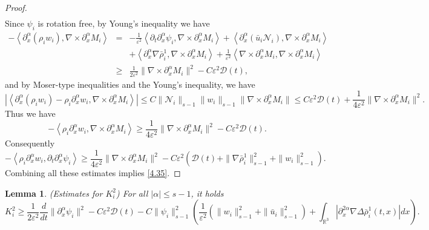 \documentclass[reqno,twoside,12pt,a4paper]{amsart}
\newcommand{\eps}{\mathbb{\varepsilon}}
\newcommand{\al}{\alpha}
\newcommand{\pa}{\partial}
\newcommand{\D}{\nabla}
\newcommand{\Ni}{\mathcal{N}_i}
\newtheorem{lemma}{Lemma}[section]
\numberwithin{equation}{section}
\begin{document}
\begin{proof}
\begin{equation*}
\begin{aligned}
\end{aligned}
\end{equation*}
Since $\psi_i$ is rotation free,  by Young's inequality we have
\begin{eqnarray*}
    - \left\langle \partial^\al_x (\rho_i w_i), \nabla \times \partial^\al_x M_i \right\rangle &= & -\frac{1}{\eps^2} \left\langle \partial_t \partial^\al_x \psi_i, \nabla \times \partial^\al_x M_i \right\rangle + \left\langle \partial^\al_x (\bar{u}_i \Ni), \nabla \times \partial^\al_x M_i \right\rangle\nonumber\\
    && + \left\langle \partial^\al_x \nabla \bar{\rho}_i^1, \nabla \times \partial^\al_x M_i \right\rangle + \frac{1}{\eps^2} \left\langle \nabla \times \partial^\al_x M_i, \nabla \times \partial^\al_x M_i \right\rangle\nonumber\\
    &\geq & \frac{1}{2\eps^2} \|\nabla \times \partial^\al_x M_i\|^2-C\eps^2\mathcal{D}(t),\nonumber
\end{eqnarray*}
and by Moser-type inequalities and the Young's inequality, we have
\begin{equation*}
    \left|\left\langle \partial^\al_x (\rho_i w_i)-\rho_i \partial^\al_x w_i, \nabla \times \partial^\al_x M_i \right\rangle\right| \leq  C \|\Ni\|_{s-1} \|w_i\|_{s-1} \|\nabla \times \partial^\al_x M_i\|  \leq  C\eps^2\mathcal{D}(t)+ \dfrac{1}{4\eps^2}\|\nabla \times \partial^\al_x M_i\|^2.    
\end{equation*}
Thus we have
\begin{equation*}
    -\left\langle \rho_i \partial^\al_x w_i, \nabla \times \partial^\al_x M_i \right\rangle \geq \frac{1}{4\eps^2} \|\nabla \times \partial^\al_x M_i\|^2-C\eps^2\mathcal{D}(t).
\end{equation*}
Consequently
\begin{equation*}
-\left\langle \rho_i \partial^\al_x w_i, \partial_t \partial^\al_x \psi_i \right\rangle \geq \frac{1}{4\eps^2} \|\nabla \times \partial^\al_x M_i\|^2-C\eps^2(\mathcal{D}(t)+\|\nabla \bar{\rho}_i^1\|_{s-1}^2+\|w_i\|^2_{s-1}).
\end{equation*}
Combining all these estimates implies \eqref{4.35}. 
\end{proof}


\begin{lemma}\label{lemma4.3}(Estimates for $K_i^2$)
For all $|\alpha| \leq s-1$, it holds
\begin{equation}\label{k2integral}
K_i^2\geq \frac{1}{2\eps^2} \frac{d}{dt} \|\partial^\al_x \psi_i\|^2-C\eps^2\mathcal{D}(t) - C\|\psi_i\|_{s-1}^2 \left(\dfrac{1}{\eps^2}(\|w_i\|_{s-1}^2+\|\bar{u}_i\|^2_{s-1}) + \int_{\mathbb{R}^3} |\pa_x^{2\al} \D \Delta \bar{\rho}^1_i (t,x)| dx \right).
\end{equation}
\end{lemma}
\end{document}
